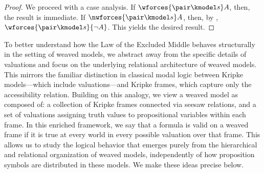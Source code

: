 \begin{proof}
    We proceed with a case analysis.
    If $\wforces {\pair \kmodel s} A$, then, the result is immediate.
    If $\nwforces {\pair \kmodel s} A$, then, by , $\wforces {\pair \kmodel s} {\lnot A}$.
    This yields the desired result.
\end{proof}

To better understand how the Law of the Excluded Middle behaves structurally in the setting of weaved models, we abstract away from the specific details of valuations and focus on the underlying relational architecture of weaved models. This mirrors the familiar distinction in classical modal logic between Kripke models---which include valuations---and Kripke frames, which capture only the accessibility relation. Building on this analogy, we view a weaved model as composed of: a collection of Kripke frames connected via seesaw relations, and a set of valuations assigning truth values to propositional variables within each frame. In this enriched framework, we say that a formula is valid on a weaved frame if it is true at every world in every possible valuation over that frame. This allows us to study the logical behavior that emerges purely from the hierarchical and relational organization of weaved models, independently of how proposition symbols are distributed in these models. We make these ideas precise below.


